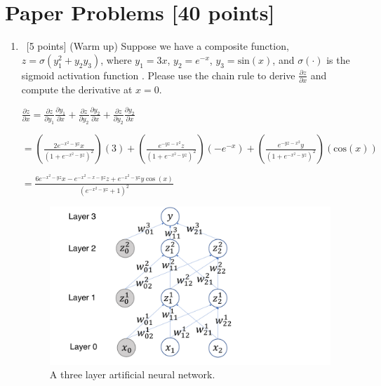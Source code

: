 \documentclass[12pt, fullpage,letterpaper]{article}
\begin{document}
\section{Paper Problems [40 points]}
\begin{enumerate}
	\item~[5 points] (Warm up) Suppose we have a composite function, $z = \sigma(y_1^2 +y_2y_3) $, where  $y_1 = 3x$, $y_2 = e^{-x}$, $y_3 = \mathrm{sin}(x)$, and $\sigma(\cdot)$ is the sigmoid activation function . Please use the chain rule to derive $\frac{\partial z}{\partial x}$ and  compute the derivative at $x=0$. 
	
	$\frac{\partial z}{\partial x} = \frac{\partial z}{\partial y_1}\frac{\partial y_1}{\partial x} + \frac{\partial z}{\partial y_2}\frac{\partial y_2}{\partial x} + \frac{\partial z}{\partial y_2}\frac{\partial y_2}{\partial x}$

	$ = (\frac{2e^{-x^2-yz}x}{\left(1+e^{-x^2-yz}\right)^2})(3) + (\frac{e^{-yz-x^2}z}{\left(1+e^{-x^2-yz}\right)^2})(-e^{-x}) + (\frac{e^{-yz-x^2}y}{\left(1+e^{-x^2-yz}\right)^2})(\mathrm{cos}(x))$
	
	$= \frac{6e^{-x^2-yz}x-e^{-x^2-x-yz}z+e^{-x^2-yz}y\cos \left(x\right)}{\left(e^{-x^2-yz}+1\right)^2}$
	
	
	
	\begin{figure}
		\centering
		\includegraphics[width=1.0\textwidth]{fig.pdf}
		\caption{\small A three layer artificial neural network.} 
		\label{fig:3nn}
	\end{figure}
	

\end{enumerate}
\end{document}

